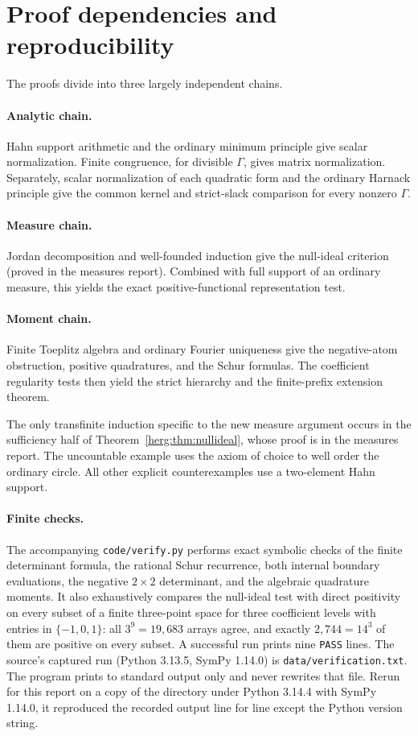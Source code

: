\documentclass[11pt,letterpaper]{article}
\theoremstyle{definition}
\numberwithin{equation}{section}
\begin{document}
\section{Proof dependencies and reproducibility}
\label{herg:app:verification}

The proofs divide into three largely independent chains.

\paragraph{Analytic chain.}
Hahn support arithmetic and the ordinary minimum principle give scalar normalization. Finite congruence, for divisible $\Gamma$, gives matrix normalization. Separately, scalar normalization of each quadratic form and the ordinary Harnack principle give the common kernel and strict-slack comparison for every nonzero $\Gamma$.

\paragraph{Measure chain.}
Jordan decomposition and well-founded induction give the null-ideal criterion (proved in the measures report). Combined with full support of an ordinary measure, this yields the exact positive-functional representation test.

\paragraph{Moment chain.}
Finite Toeplitz algebra and ordinary Fourier uniqueness give the negative-atom obstruction, positive quadratures, and the Schur formulas. The coefficient regularity tests then yield the strict hierarchy and the finite-prefix extension theorem.

The only transfinite induction specific to the new measure argument occurs in the sufficiency half of Theorem~\ref{herg:thm:nullideal}, whose proof is in the measures report. The uncountable example uses the axiom of choice to well order the ordinary circle. All other explicit counterexamples use a two-element Hahn support.

\paragraph{Finite checks.}
The accompanying \texttt{code/verify.py} performs exact symbolic checks of the finite determinant formula, the rational Schur recurrence, both internal boundary evaluations, the negative $2\times2$ determinant, and the algebraic quadrature moments. It also exhaustively compares the null-ideal test with direct positivity on every subset of a finite three-point space for three coefficient levels with entries in $\{-1,0,1\}$: all $3^9=19{,}683$ arrays agree, and exactly $2{,}744=14^3$ of them are positive on every subset. A successful run prints nine \texttt{PASS} lines. The source's captured run (Python 3.13.5, SymPy 1.14.0) is \texttt{data/verification.txt}. The program prints to standard output only and never rewrites that file. Rerun for this report on a copy of the directory under Python 3.14.4 with SymPy 1.14.0, it reproduced the recorded output line for line except the Python version string.
\end{document}
